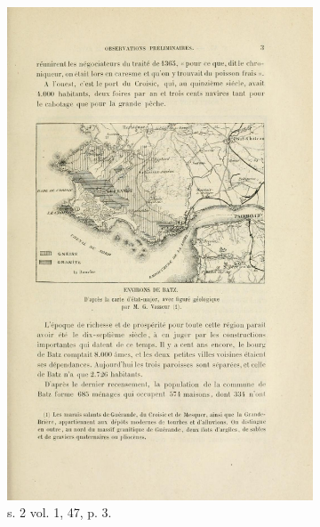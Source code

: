 \begin{figure}
    \begin{subfigure}[t]{0.4\textwidth}
     \includegraphics[width=0.8\linewidth]{img/map_s2t1_m47_p3.png}
     \caption{s. 2 vol. 1, \no{} 47, p. 3.}
    \end{subfigure}
    \hspace{5pt}
    \begin{subfigure}[t]{0.4\textwidth}

\end{subfigure}
\end{figure}
